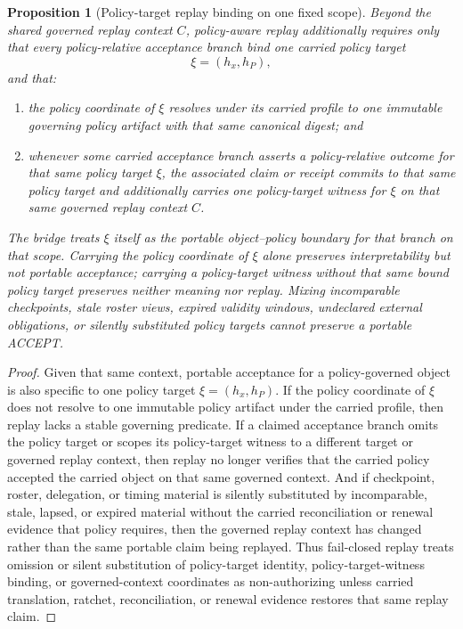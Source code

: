\documentclass[11pt]{article}
\newtheorem{proposition}{Proposition}
\begin{document}
\begin{proposition}[Policy-target replay binding on one fixed scope]
Beyond the shared governed replay context $C$, policy-aware replay additionally requires only that every policy-relative acceptance branch bind one carried \emph{policy target}
\[
\xi=(h_x,h_P),
\]
and that:
\begin{enumerate}[leftmargin=*]
  \item the policy coordinate of $\xi$ resolves under its carried profile to one immutable governing policy artifact with that same canonical digest; and
  \item whenever some carried acceptance branch asserts a policy-relative outcome for that same policy target $\xi$, the associated claim or receipt commits to that same policy target and additionally carries one policy-target witness for $\xi$ on that same governed replay context $C$.
\end{enumerate}
The bridge treats $\xi$ itself as the portable object--policy boundary for that branch on that scope.
Carrying the policy coordinate of $\xi$ alone preserves interpretability but not portable acceptance; carrying a policy-target witness without that same bound policy target preserves neither meaning nor replay.
Mixing incomparable checkpoints, stale roster views, expired validity windows, undeclared external obligations, or silently substituted policy targets cannot preserve a portable \textsf{ACCEPT}.
\end{proposition}

\begin{proof}
Given that same context, portable acceptance for a policy-governed object is also specific to one policy target $\xi=(h_x,h_P)$.
If the policy coordinate of $\xi$ does not resolve to one immutable policy artifact under the carried profile, then replay lacks a stable governing predicate.
If a claimed acceptance branch omits the policy target or scopes its policy-target witness to a different target or governed replay context, then replay no longer verifies that the carried policy accepted the carried object on that same governed context.
And if checkpoint, roster, delegation, or timing material is silently substituted by incomparable, stale, lapsed, or expired material without the carried reconciliation or renewal evidence that policy requires, then the governed replay context has changed rather than the same portable claim being replayed.
Thus fail-closed replay treats omission or silent substitution of policy-target identity, policy-target-witness binding, or governed-context coordinates as non-authorizing unless carried translation, ratchet, reconciliation, or renewal evidence restores that same replay claim.
\end{proof}
\end{document}
